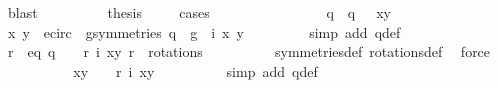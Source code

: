 \begin{isabellebody}
\ blast\ \ \isanewline
\ \ \ \ \isamarkupfalse%
\ \isamarkupfalse%
\ {\isacharquery}thesis\isanewline
\ \ \ \ \isamarkupfalse%
{\isacharparenleft}cases{\isacharparenright}\isanewline
\ \ \ \ \ \ \isamarkupfalse%
\ {}\isanewline
\ \ \ \ \ \ \isamarkupfalse%
\ q{\isacharprime}\ \ {\isachardoublequoteopen}q{\isacharprime}\ {\isacharequal}\ {\isasymtau}\ {\isacharparenleft}x{\isacharprime}{\isacharcomma}y{\isacharprime}{\isacharparenright}{\isachardoublequoteclose}\isanewline
\ \ \ \ \ \ \isamarkupfalse%
\ {}\ \isamarkupfalse%
\ {\isachardoublequoteopen}{\isacharparenleft}x{\isacharcomma}\ y{\isacharparenright}\ {\isasymin}\ e{\isacharunderscore}circ\ {\isasymand}\ {\isacharparenleft}{\isasymexists}g{\isasymin}symmetries{\isachardot}\ q{\isacharprime}\ {\isacharequal}\ {\isacharparenleft}g\ {\isasymcirc}\ i{\isacharparenright}\ {\isacharparenleft}x{\isacharcomma}\ y{\isacharparenright}{\isacharparenright}{\isachardoublequoteclose}\isanewline
\ \ \ \ \ \ \ \ \isamarkupfalse%
{\isacharparenleft}simp\ add{\isacharcolon}\ q{\isacharprime}{\isacharunderscore}def{\isacharparenright}\ \ \isanewline
\ \ \ \ \ \ \isamarkupfalse%
\ \isamarkupfalse%
\ r{\isacharprime}\ \ eq{}{\isacharcolon}\ {\isachardoublequoteopen}q{\isacharprime}\ {\isacharequal}\ {\isacharparenleft}{\isasymtau}\ {\isasymcirc}\ r{\isacharprime}{\isacharparenright}\ {\isacharparenleft}i\ {\isacharparenleft}x{\isacharcomma}y{\isacharparenright}{\isacharparenright}{\isachardoublequoteclose}\ {\isachardoublequoteopen}r{\isacharprime}\ {\isasymin}\ rotations{\isachardoublequoteclose}\isanewline
\ \ \ \ \ \ \ \ \isamarkupfalse%
\ symmetries{\isacharunderscore}def\ rotations{\isacharunderscore}def\ \isamarkupfalse%
\ force\isanewline
\ \ \ \ \ \ \isamarkupfalse%
\ \isamarkupfalse%
\ {\isachardoublequoteopen}{\isasymtau}\ {\isacharparenleft}x{\isacharprime}{\isacharcomma}y{\isacharprime}{\isacharparenright}\ {\isacharequal}\ {\isacharparenleft}{\isasymtau}\ {\isasymcirc}\ r{\isacharprime}{\isacharparenright}\ {\isacharparenleft}i\ {\isacharparenleft}x{\isacharcomma}y{\isacharparenright}{\isacharparenright}{\isachardoublequoteclose}\ \isanewline
\ \ \ \ \ \ \ \ \isamarkupfalse%
{\isacharparenleft}simp\ add{\isacharcolon}\ q{\isacharprime}{\isacharunderscore}def{\isacharparenright}\ \ \isanewline

\end{isabellebody}

